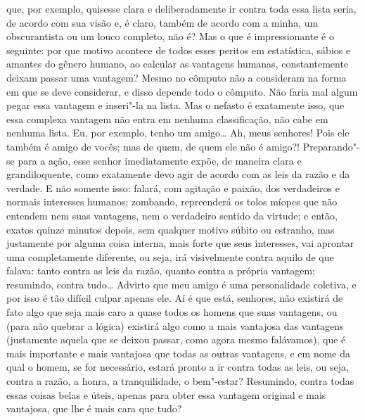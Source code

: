 que, por exemplo, quisesse clara e deliberadamente ir contra toda essa
lista seria, de acordo com sua visão e, é claro, também de acordo com a
minha, um obscurantista ou um louco completo, não é? Mas o que é
impressionante é o seguinte: por que motivo acontece de todos esses
peritos em estatística, sábios e amantes do gênero humano, ao calcular
as vantagens humanas, constantemente deixam passar uma vantagem? Mesmo
no cômputo não a consideram na forma em que se deve considerar, e disso
depende todo o cômputo. Não faria mal algum pegar essa vantagem e
inseri"-la na lista. Mas o nefasto é exatamente isso, que essa complexa
vantagem não entra em nenhuma classificação, não cabe em nenhuma lista.
Eu, por exemplo, tenho um amigo\ldots{} Ah, meus senhores! Pois ele também é
amigo de vocês; mas de quem, de quem ele não é amigo?! Preparando"-se
para a ação, esse senhor imediatamente expõe, de maneira clara e
grandiloquente, como exatamente devo agir de acordo com as leis da
razão e da verdade. E não somente isso: falará, com agitação e paixão,
dos verdadeiros e normais interesses humanos; zombando, repreenderá os
tolos míopes que não entendem nem suas vantagens, nem o verdadeiro
sentido da virtude; e então, exatos quinze minutos depois, sem qualquer
motivo súbito ou estranho, mas justamente por alguma coisa interna,
mais forte que seus interesses, vai aprontar uma completamente
diferente, ou seja, irá visivelmente contra aquilo de que falava: tanto
contra as leis da razão, quanto contra a própria vantagem; resumindo,
contra tudo\ldots{} Advirto que meu amigo é uma personalidade coletiva, e
por isso é tão difícil culpar apenas ele. Aí é que está, senhores, não
existirá de fato algo que seja mais caro a quase todos os homens que
suas vantagens, ou (para não quebrar a lógica) existirá algo como a
mais vantajosa das vantagens (justamente aquela que se deixou passar,
como agora mesmo falávamos), que é mais importante e mais vantajosa que
todas as outras vantagens, e em nome da qual o homem, se for
necessário, estará pronto a ir contra todas as leis, ou seja, contra a
razão, a honra, a tranquilidade, o bem"-estar? Resumindo, contra todas
essas coisas belas e úteis, apenas para obter essa vantagem original e
mais vantajosa, que lhe é mais cara que tudo?

